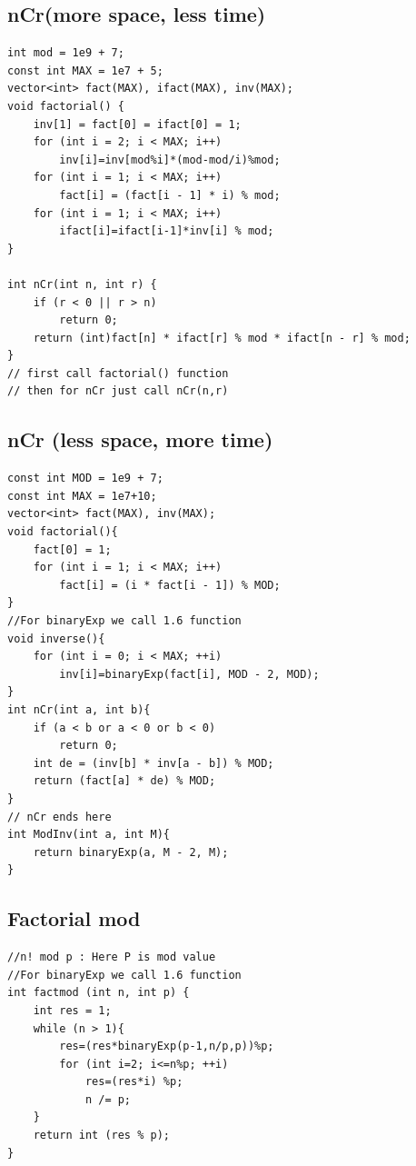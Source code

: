 \subsection{nCr(more space, less time)}
\begin{lstlisting}
int mod = 1e9 + 7;
const int MAX = 1e7 + 5;
vector<int> fact(MAX), ifact(MAX), inv(MAX);
void factorial() {
    inv[1] = fact[0] = ifact[0] = 1;
    for (int i = 2; i < MAX; i++)
        inv[i]=inv[mod%i]*(mod-mod/i)%mod;
    for (int i = 1; i < MAX; i++)
        fact[i] = (fact[i - 1] * i) % mod;
    for (int i = 1; i < MAX; i++)
        ifact[i]=ifact[i-1]*inv[i] % mod;
}

int nCr(int n, int r) {
    if (r < 0 || r > n)
        return 0;
    return (int)fact[n] * ifact[r] % mod * ifact[n - r] % mod;
}
// first call factorial() function
// then for nCr just call nCr(n,r)
\end{lstlisting}
\subsection{nCr (less space, more time)}
\begin{lstlisting}
const int MOD = 1e9 + 7;
const int MAX = 1e7+10;
vector<int> fact(MAX), inv(MAX);
void factorial(){
    fact[0] = 1;
    for (int i = 1; i < MAX; i++)
        fact[i] = (i * fact[i - 1]) % MOD;
}
//For binaryExp we call 1.6 function
void inverse(){
    for (int i = 0; i < MAX; ++i)
        inv[i]=binaryExp(fact[i], MOD - 2, MOD);
}
int nCr(int a, int b){
    if (a < b or a < 0 or b < 0)
        return 0;
    int de = (inv[b] * inv[a - b]) % MOD;
    return (fact[a] * de) % MOD;
}
// nCr ends here
int ModInv(int a, int M){
    return binaryExp(a, M - 2, M);
}
\end{lstlisting}
\subsection{Factorial mod}
\begin{lstlisting}
//n! mod p : Here P is mod value
//For binaryExp we call 1.6 function
int factmod (int n, int p) {
    int res = 1;
    while (n > 1){
        res=(res*binaryExp(p-1,n/p,p))%p;
        for (int i=2; i<=n%p; ++i)
            res=(res*i) %p;
            n /= p;
    }
    return int (res % p);
}
\end{lstlisting}
